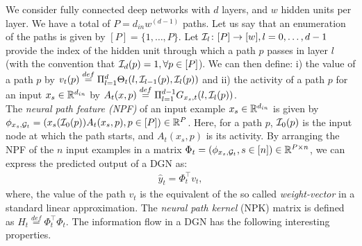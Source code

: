 We consider fully connected deep networks with $d$ layers, and $w$ hidden units per layer. We have a total of $P=d_{in}w^{(d-1)}$ paths. Let us say that an enumeration of the paths is given by $[P]=\{1,\ldots,P\}$. Let $\mathcal{I}_{l}\colon [P]\rightarrow [w],l=0,\ldots,d-1$ provide the index of the hidden unit through which a path $p$ passes in layer $l$ (with the convention that $\mathcal{I}_d(p)=1,\forall p\in [P]$). We can then define: i) the value of a path $p$ by $v_t(p)\stackrel{def}=\Pi_{l=1}^d \Theta_t(l,\mathcal{I}_{l-1}(p),\mathcal{I}_l(p))$ and ii) the activity of a path $p$ for an input $x_s\in \mathbb{R}^{d_{in}}$ by $A_{t}(x,p)\stackrel{def}{=}\Pi_{l=1}^{d-1} G_{x_s,t}(l,\mathcal{I}_l(p))$.\\
 The \emph{neural path feature (NPF)} of an input example $x_s\in \mathbb{R}^{d_{in}}$ is given by $\phi_{x_s,\mathcal{G}_t}=(x_s(\mathcal{I}_0(p))A_t(x_s,p) ,p\in[P])\in\mathbb{R}^P$. Here, for a path $p$, $\mathcal{I}_0(p)$ is the input node at which the path starts, and $A_t(x_s,p)$ is its activity. By arranging the NPF of the $n$ input examples in a matrix $\Phi_t=(\phi_{x_s,\mathcal{G}_t},s\in[n])\in\mathbb{R}^{P\times n}$, we can express the predicted output of a DGN as: 
\begin{align}\label{eq:npfbasic}
\hat{y}_t=\Phi_t^\top v_t,
\end{align}
where, the value of the path $v_t$ is the equivalent of the so called \emph{weight-vector} in a standard linear approximation. The \emph{neural path kernel} (NPK) matrix is defined as $H_t\stackrel{def}=\Phi^\top_t\Phi_t$. The information flow in a DGN has the following interesting properties.\\
